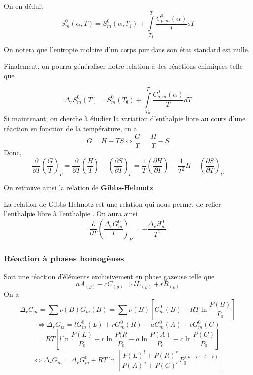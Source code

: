 On en déduit 
\begin{equation}
S_m^0(\alpha, T)=S_m^0(\alpha, T_1) + \int \limits _{T_1}^T \frac {C_{p,m}^0(\alpha)}{T}dT
\end{equation}

On notera que l'entropie molaire d'un corps pur dans son état standard est nulle.

Finalement, on pourra généraliser notre relation à des réactions chimiques telle que

\begin{equation}
\Delta_rS_m^0(T)=S_m^0( T_0) + \int \limits _{T_0}^T \frac {C_{p,m}^0(\alpha)}{T}dT
\end{equation}
Si maintenant, on cherche à étudier la variation d'enthalpie libre au cours d'une réaction en fonction de la température, on a 
$$G=H-TS \Leftrightarrow \frac{G}{T}=\frac{H}{T}-S$$
Donc, 
$$\frac{\partial}{\partial T}\left (\frac{G}{T}\right )_P = \frac{\partial}{\partial T}\left ( \frac{H}{T}\right ) - \left ( \frac{\partial S}{\partial T}\right ) _P = \frac{1}{T} \left ( \frac{\partial H}{\partial T} \right ) - \frac{1}{T^2}H - \left ( \frac{\partial S}{\partial T}\right ) _P $$

On retrouve ainsi la relation de \textbf{Gibbs-Helmotz} 

\begin{theorem}
La relation de Gibbs-Helmotz est une relation qui nous permet de relier l'enthalpie libre à l'enthalpie . On aura ainsi
\begin{equation}
\frac{\partial}{\partial T}\left ( \frac{\Delta_rG_m^0}{T}\right )_P=-\frac{\Delta_rH_m^0}{T^2}
\end{equation}
\end{theorem}


\subsubsection{Réaction à phases homogènes}

Soit une réaction d'éléments exclusivement en phase gazeuse telle que 
$$aA_{(g)}+cC_{(g)} \Longrightarrow lL_{(g)}+rR_{(g)}$$
On a 
$$\Delta _ r G_m = \sum \nu (B)G_m(B) = \sum \nu (B) [G_m^0(B)+RT\ln \frac{P(B)}{P_0}]$$
$$\Leftrightarrow \Delta _ r G_m = l G_m^0 (L) + r G_m^0(R) - a G_m^0(A)-c G_m^0(C)$$
$$= RT \left [ l \ln \frac{P(L)}{P_0} + r \ln \frac{P(R}{P_0}-a\ln \frac{P(A)}{P_0} - c \ln \frac{P(C)}{P_0}\right ]$$
$$\Leftrightarrow \Delta _ r G_m = \Delta _ r G_m^0 + RT \ln \left [  \frac{ P(L)^l + P(R)^r}{P(A)^a+P(C)^c}P_0^{(a+c-l-r)}\right ]$$

